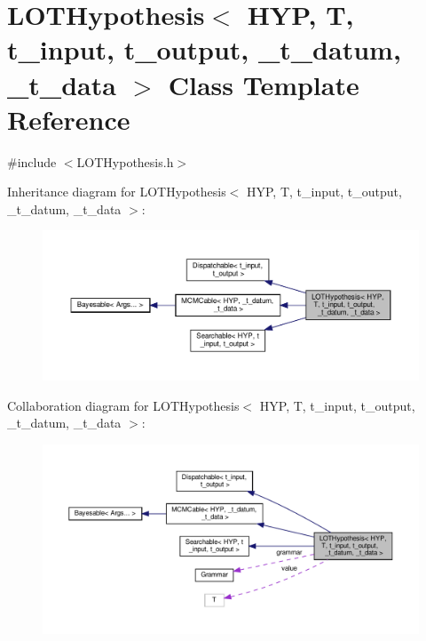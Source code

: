\hypertarget{class_l_o_t_hypothesis}{}\section{L\+O\+T\+Hypothesis$<$ H\+YP, T, t\+\_\+input, t\+\_\+output, \+\_\+t\+\_\+datum, \+\_\+t\+\_\+data $>$ Class Template Reference}
\label{class_l_o_t_hypothesis}


{\ttfamily \#include $<$L\+O\+T\+Hypothesis.\+h$>$}



Inheritance diagram for L\+O\+T\+Hypothesis$<$ H\+YP, T, t\+\_\+input, t\+\_\+output, \+\_\+t\+\_\+datum, \+\_\+t\+\_\+data $>$\+:\nopagebreak
\begin{figure}[H]
\begin{center}
\leavevmode
\includegraphics[width=350pt]{class_l_o_t_hypothesis__inherit__graph}
\end{center}
\end{figure}


Collaboration diagram for L\+O\+T\+Hypothesis$<$ H\+YP, T, t\+\_\+input, t\+\_\+output, \+\_\+t\+\_\+datum, \+\_\+t\+\_\+data $>$\+:\nopagebreak
\begin{figure}[H]
\begin{center}
\leavevmode
\includegraphics[width=350pt]{class_l_o_t_hypothesis__coll__graph}
\end{center}
\end{figure}
